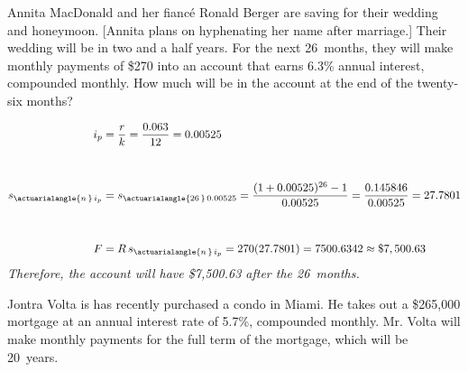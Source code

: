 \documentclass[12pt,letterpaper]{exam}
\begin{document}
\begin{questions}
\newpage
\question[10] Annita MacDonald and her fianc\'e Ronald Berger are saving for their wedding and honeymoon. [Annita plans on hyphenating her name after marriage.] Their wedding will be in two and a half years. For the next 26~months, they will make monthly payments of \$270 into an account that earns 6.3\% annual interest, compounded monthly. How much will be in the account at the end of the twenty-six months? \pvspace{1cm}

{\itshape
	\[
	\begin{aligned}
	i_p&= \dfrac{r}{k}= \dfrac{0.063}{12}= 0.00525 \\[1cm]
	s_{\actuarialangle{n\,}\, i_p}&= s_{\actuarialangle{26\,}\, 0.00525}= \dfrac{(1 + 0.00525)^{26} - 1}{0.00525}= \dfrac{0.145846}{0.00525}= 27.7801 \\[1cm]
	F&= R\, s_{\actuarialangle{n\,}\, i_p}= 270(27.7801)= 7500.6342 \approx \$7,500.63
	\end{aligned}
	\] \pvspace{0.4cm}
Therefore, the account will have \$7,500.63 after the 26~months. 
}



\newpage
\question Jontra Volta is has recently purchased a condo in Miami. He takes out a \$265,000 mortgage at an annual interest rate of 5.7\%, compounded monthly. Mr. Volta will make monthly payments for the full term of the mortgage, which will be 20~years. \pspace
	
\end{questions}
\end{document}
